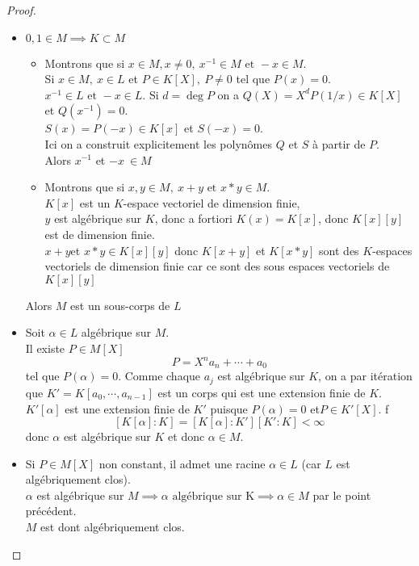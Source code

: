 \begin{proof}
	\begin{itemize}
		\item $0,1 \in M \implies K \subset M$ \\
		      \begin{itemize}
			      \item
			            Montrons que si $x \in M, x \neq 0, \  x^{-1} \in M \text{ et } -x \in M$. \\
			            Si $x \in M, \ x \in L$ et $P \in K[X], \ P \neq 0$ tel que $P (x) = 0$.\\
			            $x^{-1} \in L \text{ et } -x \in L$. Si $d = \deg P$ on a $Q(X) = X^d P(1/x) \in K[X]$ et $Q(x^{-1}) = 0$.\\
			            $S(x) = P(-x) \in K[x]$ et $S(-x) = 0$. \\
			            Ici on a construit explicitement les polynômes $Q$ et $S$ à partir de $P$.\\
			            Alors $x^{-1}$ et $-x \ \in M$
			      \item Montrons que si $x,y \in M, \  x + y \text{ et } x*y \in M$. \\
			            $K[x]$ est un $K$-espace vectoriel de dimension finie, \\
			            $y$ est algébrique sur $K$, donc a fortiori $K(x) =  K[x]$, donc $K[x][y]$ est de dimension finie.\\
			            $x+y $et $x*y\in K[x][y]$ donc $K[x+y]$ et $K[x*y]$ sont des $K$-espaces vectoriels de dimension finie car
			            ce sont des sous espaces vectoriels de $K[x][y]$
		      \end{itemize}
		      Alors $M$ est un sous-corps de $L$
		\item Soit $\alpha \in L$ algébrique sur $M$.\\
		      Il existe $P \in M[X]$
		      $$ P = X^na_n + \cdots + a_0$$
		      tel que $P(\alpha) = 0$. Comme chaque $a_j$ est algébrique sur $K$, on a par itération que $K'=K[a_0,\cdots, a_{n-1}]$ est un corps qui est une extension finie de $K$.\\
		      $K'[\alpha]$ est une extension finie de $K'$ puisque $P(\alpha)=0$ et$P \in K'[X]$. f
		      $$ \left[K[\alpha] : K\right]  =  \left[K[\alpha] : K'\right] \left[K' : K\right] < \infty $$
		      donc $\alpha$ est algébrique sur $K$ et donc $\alpha \in M$.
		\item
		      Si $P \in M[X]$ non constant, il admet une racine $\alpha \in L$ (car $L$ est algébriquement clos). \\
		      $\alpha$ est algébrique sur $M \implies \alpha \text{ algébrique sur K} \implies  \alpha \in M$ par le point précédent.\\
		      $M$ est dont algébriquement clos.
	\end{itemize}
\end{proof}

